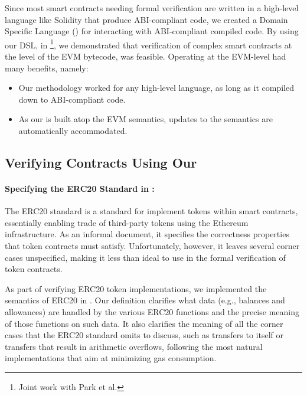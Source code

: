 Since most smart contracts needing formal verification are written in a high-level
language like Solidity \cite{SolidityUrl} that produce ABI-compliant code, we
created a Domain Specific Language (\DSL{}) for interacting with ABI-compliant compiled
code. By using our DSL, in \cite{ParkFSE18} \footnote{Joint work with Park et al.},
we demonstrated that verification of complex smart contracts at the level of the
EVM bytecode, was feasible. Operating at the EVM-level had many benefits,
namely:
\begin{itemize}
  \item Our methodology worked for any high-level language, as long as it
    compiled down to ABI-compliant code.
  \item As our \DSL{} is built atop the EVM semantics, updates to the semantics
    are automatically accommodated.
\end{itemize}


\subsection{Verifying Contracts Using Our \DSL{}}\label{sec:verifying-contracts-dsl}

\paragraph{Specifying the ERC20 Standard in \K{}:}
The ERC20 standard \cite{ERC20Url} is a standard for implement tokens within
smart contracts, essentially enabling trade of third-party tokens using the
Ethereum infrastructure.
As an informal document, it specifies the correctness properties that
token contracts must satisfy.
Unfortunately, however, it leaves several corner cases unspecified,
making it less than ideal to use in the formal verification of token contracts. %

As part of verifying ERC20 token implementations, we implemented the semantics
of ERC20 in \K{}. Our definition
clarifies what data
(e.g., balances and allowances) are handled by the various ERC20 functions
and the precise meaning of those functions on such data.
It also clarifies the meaning of all the corner cases that the ERC20 standard omits to discuss,
such as transfers to itself or transfers that result in arithmetic overflows,
following the most natural implementations that aim at minimizing gas consumption.

